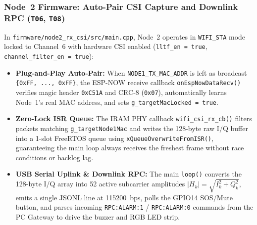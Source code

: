 \documentclass{hcmut-report}
\begin{document}
\subsubsection{Node~2 Firmware: Auto-Pair CSI Capture and Downlink RPC (\texttt{T06}, \texttt{T08})}
In \texttt{firmware/node2\_rx\_csi/src/main.cpp}, Node~2 operates in \texttt{WIFI\_STA} mode locked to Channel~6 with hardware CSI enabled (\texttt{lltf\_en = true}, \texttt{channel\_filter\_en = true}):
\begin{itemize}
  \item \textbf{Plug-and-Play Auto-Pair:} When \texttt{NODE1\_TX\_MAC\_ADDR} is left as broadcast \texttt{\{0xFF, ..., 0xFF\}}, the ESP-NOW receive callback \texttt{onEspNowDataRecv()} verifies magic header \texttt{0xC51A} and CRC-8 (\texttt{0x07}), automatically learns Node~1's real MAC address, and sets \texttt{g\_targetMacLocked = true}.
  \item \textbf{Zero-Lock ISR Queue:} The IRAM PHY callback \texttt{wifi\_csi\_rx\_cb()} filters packets matching \texttt{g\_targetNode1Mac} and writes the 128-byte raw I/Q buffer into a 1-slot FreeRTOS queue using \texttt{xQueueOverwriteFromISR()}, guaranteeing the main loop always receives the freshest frame without race conditions or backlog lag.
  \item \textbf{USB Serial Uplink \& Downlink RPC:} The main \texttt{loop()} converts the 128-byte I/Q array into 52 active subcarrier amplitudes $|H_k| = \sqrt{I_k^2 + Q_k^2}$, emits a single JSONL line at 115200~bps, polls the GPIO14 SOS/Mute button, and parses incoming \texttt{RPC:ALARM:1} / \texttt{RPC:ALARM:0} commands from the PC Gateway to drive the buzzer and RGB LED strip.
\end{itemize}
\end{document}
